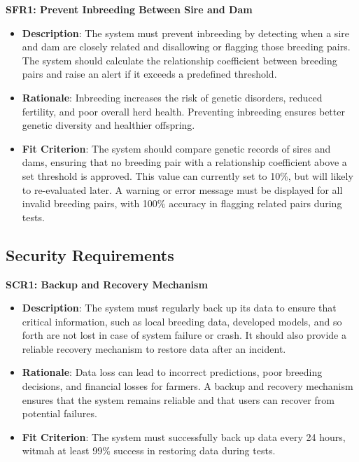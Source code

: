\documentclass{article}
\begin{document}
\textbf{SFR1: Prevent Inbreeding Between Sire and Dam} 
\begin{itemize}
    \item \textbf{Description}: The system must prevent inbreeding by detecting 
    when a sire and dam are closely related and disallowing or flagging those 
    breeding pairs. The system should calculate the relationship coefficient 
    between breeding pairs and raise an alert if it exceeds a predefined 
    threshold.
    \item \textbf{Rationale}: Inbreeding increases the risk of genetic 
    disorders, reduced fertility, and poor overall herd health. Preventing 
    inbreeding ensures better genetic diversity and healthier offspring.
    \item \textbf{Fit Criterion}: The system should compare genetic records of 
    sires and dams, ensuring that no breeding pair with a relationship 
    coefficient above a set threshold is approved. This value can currently set 
    to 10\%, but will likely to re-evaluated later. A warning or error message 
    must be displayed for all invalid breeding pairs, with 100\% accuracy in 
    flagging related pairs during tests.
\end{itemize}
\vspace{10pt}

\subsection{Security Requirements}

\textbf{SCR1: Backup and Recovery Mechanism} 
\begin{itemize}
    \item \textbf{Description}: The system must regularly back up its data to 
    ensure that critical information, such as local breeding data, developed models, and so forth are not lost in case of system failure or crash. It should also 
    provide a reliable recovery mechanism to restore data after an incident.
    \item \textbf{Rationale}: Data loss can lead to incorrect predictions, poor 
    breeding decisions, and financial losses for farmers. A backup and recovery 
    mechanism ensures that the system remains reliable and that users can 
    recover from potential failures.
    \item \textbf{Fit Criterion}: The system must successfully back up data 
    every 24 hours, witmah at least 99\% success in restoring data during tests.
\end{itemize}
\vspace{10pt}
\end{document}
